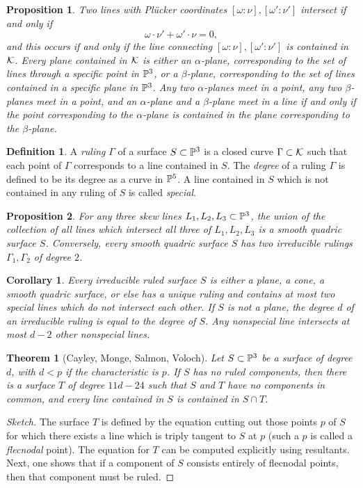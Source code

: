 \documentclass[letterpaper,11pt]{article}
\newtheorem{thm}{Theorem}
\newtheorem{cor}{Corollary}
\newtheorem{prop}{Proposition}
\theoremstyle{definition}
\newtheorem{defn}{Definition}
\theoremstyle{remark}
\begin{document}
\begin{prop} Two lines with Pl\"ucker coordinates $[\omega:\nu], [\omega':\nu']$ intersect if and only if
\[
\omega\cdot\nu' + \omega'\cdot\nu = 0,
\]
and this occurs if and only if the line connecting $[\omega:\nu], [\omega':\nu']$ is contained in $\mathcal{K}$. Every plane contained in $\mathcal{K}$ is either an $\alpha$-plane, corresponding to the set of lines through a specific point in $\mathbb{P}^3$, or a $\beta$-plane, corresponding to the set of lines contained in a specific plane in $\mathbb{P}^3$. Any two $\alpha$-planes meet in a point, any two $\beta$-planes meet in a point, and an $\alpha$-plane and a $\beta$-plane meet in a line if and only if the point corresponding to the $\alpha$-plane is contained in the plane corresponding to the $\beta$-plane.
\end{prop}

\begin{defn} A \emph{ruling} $\Gamma$ of a surface $S\subset \mathbb{P}^3$ is a closed curve $\Gamma\subset \mathcal{K}$ such that each point of $\Gamma$ corresponds to a line contained in $S$. The \emph{degree} of a ruling $\Gamma$ is defined to be its degree as a curve in $\mathbb{P}^5$. A line contained in $S$ which is not contained in any ruling of $S$ is called \emph{special}.
\end{defn}

\begin{prop} For any three skew lines $L_1, L_2, L_3 \subset \mathbb{P}^3$, the union of the collection of all lines which intersect all three of $L_1, L_2, L_3$ is a smooth quadric surface $S$. Conversely, every smooth quadric surface $S$ has two irreducible rulings $\Gamma_1, \Gamma_2$ of degree $2$.
\end{prop}

\begin{cor} Every irreducible ruled surface $S$ is either a plane, a cone, a smooth quadric surface, or else has a unique ruling and contains at most two special lines which do not intersect each other. If $S$ is not a plane, the degree $d$ of an irreducible ruling is equal to the degree of $S$. Any nonspecial line intersects at most $d-2$ other nonspecial lines.
\end{cor}

\begin{thm}[Cayley, Monge, Salmon, Voloch]\label{salmon} Let $S\subset \mathbb{P}^3$ be a surface of degree $d$, with $d < p$ if the characteristic is $p$. If $S$ has no ruled components, then there is a surface $T$ of degree $11d-24$ such that $S$ and $T$ have no components in common, and every line contained in $S$ is contained in $S\cap T$.
\end{thm}
\begin{proof}[Sketch] The surface $T$ is defined by the equation cutting out those points $p$ of $S$ for which there exists a line which is triply tangent to $S$ at $p$ (such a $p$ is called a \emph{flecnodal} point). The equation for $T$ can be computed explicitly using resultants. Next, one shows that if a component of $S$ consists entirely of flecnodal points, then that component must be ruled.
\end{proof}
\end{document}
